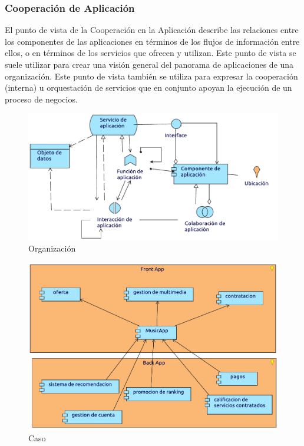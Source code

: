 \newpage

\subsubsection{Cooperación de Aplicación}
El punto de vista de la Cooperación en la Aplicación describe las relaciones entre los componentes de las aplicaciones en términos de los flujos de información entre ellos, o en términos de los servicios que ofrecen y utilizan. Este punto de vista se suele utilizar para crear una visión general del panorama de aplicaciones de una organización. Este punto de vista también se utiliza para expresar la cooperación (interna) u orquestación de servicios que en conjunto apoyan la ejecución de un proceso de negocios.
\begin{figure}[h!]
	\centering
	\includegraphics[width=\linewidth]{Desarrollo/ArquitecturaEmpresarial/Aplicacion/imgs/CooperacionMetamodelo.pdf}
	\caption{Organización}
\end{figure}
\newpage
{}

\begin{figure}[h!]
	\centering
	\includegraphics[width=\linewidth]{Desarrollo/ArquitecturaEmpresarial/Aplicacion/imgs/Cooperacion.pdf}
	\caption{Caso}
\end{figure}

